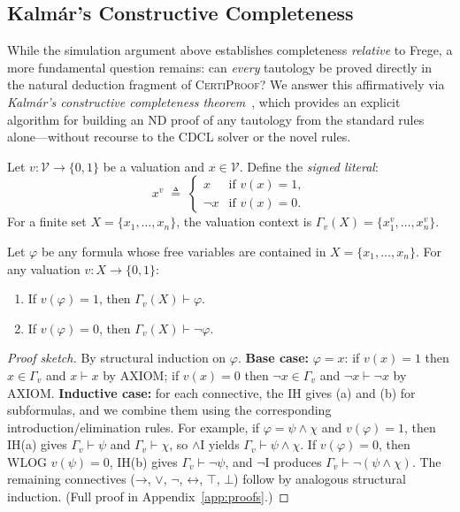 \documentclass[acmtocl,review,anonymous]{acmart}
\newcommand{\proves}{\vdash}
\newcommand{\dland}{\mathbin{\wedge}}
\newcommand{\dlor}{\mathbin{\vee}}
\newcommand{\dlnot}{\neg}
\newcommand{\dlimp}{\mathbin{\to}}
\newcommand{\dliff}{\mathbin{\leftrightarrow}}
\newcommand{\dlbot}{\bot}
\newcommand{\dltop}{\top}
\newcommand{\CP}{\textsc{CertiProof}}
\begin{document}
\subsection{Kalm\'{a}r's Constructive Completeness}

While the simulation argument above establishes completeness
\emph{relative} to Frege, a more fundamental question remains: can
\emph{every} tautology be proved directly in the natural deduction
fragment of \CP{}?  We answer this affirmatively via
\emph{Kalm\'{a}r's constructive completeness theorem}~\cite{Kalmar1935},
which provides an explicit algorithm for building an ND proof of
any tautology from the standard rules alone---without recourse to
the CDCL solver or the novel rules.

\begin{definition}
  Let $v : \mathcal{V} \to \{0,1\}$ be a valuation and
  $x \in \mathcal{V}$.  Define the \emph{signed literal}:
  \[
    x^{v} \;\triangleq\;
    \begin{cases}
      x       & \text{if } v(x) = 1, \\
      \neg x  & \text{if } v(x) = 0.
    \end{cases}
  \]
  For a finite set $X = \{x_1,\dots,x_n\}$, the valuation context
  is $\Gamma_v(X) = \{x_1^{v}, \dots, x_n^{v}\}$.
\end{definition}

\begin{lemma}
  \label{lem:kalmar}
  Let $\varphi$ be any formula whose free variables are contained
  in $X = \{x_1, \dots, x_n\}$.  For any valuation
  $v : X \to \{0,1\}$:
  \begin{enumerate}
    \item[(a)] If $v(\varphi) = 1$, then
      $\Gamma_v(X) \proves \varphi$.
    \item[(b)] If $v(\varphi) = 0$, then
      $\Gamma_v(X) \proves \dlnot\varphi$.
  \end{enumerate}
\end{lemma}
\begin{proof}[Proof sketch]
  By structural induction on $\varphi$.  \textbf{Base case:}
  $\varphi = x$: if $v(x)=1$ then $x \in \Gamma_v$ and
  $x \proves x$ by \textsc{AXIOM}; if $v(x)=0$ then
  $\dlnot x \in \Gamma_v$ and $\dlnot x \proves \dlnot x$ by
  \textsc{AXIOM}.  \textbf{Inductive case:} for each connective,
  the IH gives (a) and (b) for subformulas, and we combine them using
  the corresponding introduction/elimination rules.  For example, if
  $\varphi = \psi \dland \chi$ and $v(\varphi)=1$, then IH(a) gives
  $\Gamma_v \proves \psi$ and $\Gamma_v \proves \chi$, so
  $\land$\textsc{I} yields $\Gamma_v \proves \psi \dland \chi$.  If
  $v(\varphi)=0$, then WLOG $v(\psi)=0$, IH(b) gives
  $\Gamma_v \proves \dlnot\psi$, and $\dlnot$\textsc{I} produces
  $\Gamma_v \proves \dlnot(\psi \dland \chi)$.  The remaining
  connectives ($\dlimp$, $\dlor$, $\dlnot$, $\dliff$, $\dltop$,
  $\dlbot$) follow by analogous structural induction.
  (Full proof in Appendix~\ref{app:proofs}.)
\end{proof}
\end{document}
